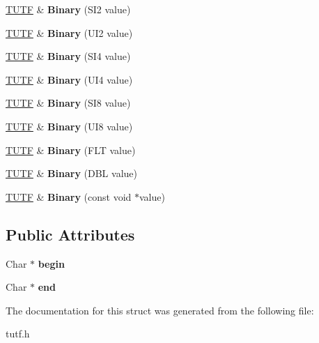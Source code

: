 \begin{DoxyCompactItemize}
\mbox{\hyperlink{struct___1_1_t_u_t_f}{T\+U\+TF}} \& {\bfseries Binary} (S\+I2 value)
\item 
\mbox{\label{struct___1_1_t_u_t_f_a0c7d211355105fa9977331f0c8e8d592}} 
\mbox{\hyperlink{struct___1_1_t_u_t_f}{T\+U\+TF}} \& {\bfseries Binary} (U\+I2 value)
\item 
\mbox{\label{struct___1_1_t_u_t_f_a6c8d9d534aa7e775af896a83462954c1}} 
\mbox{\hyperlink{struct___1_1_t_u_t_f}{T\+U\+TF}} \& {\bfseries Binary} (S\+I4 value)
\item 
\mbox{\label{struct___1_1_t_u_t_f_abf686fe4bb21e8edb06a7521ec082f72}} 
\mbox{\hyperlink{struct___1_1_t_u_t_f}{T\+U\+TF}} \& {\bfseries Binary} (U\+I4 value)
\item 
\mbox{\label{struct___1_1_t_u_t_f_ad7c1b1c4898e07fd50b14460eb7d38b5}} 
\mbox{\hyperlink{struct___1_1_t_u_t_f}{T\+U\+TF}} \& {\bfseries Binary} (S\+I8 value)
\item 
\mbox{\label{struct___1_1_t_u_t_f_a8488be27f536e84b2842e2f0afae7b49}} 
\mbox{\hyperlink{struct___1_1_t_u_t_f}{T\+U\+TF}} \& {\bfseries Binary} (U\+I8 value)
\item 
\mbox{\label{struct___1_1_t_u_t_f_a8edfbe73971ce6db7c2f6aafd3c5941f}} 
\mbox{\hyperlink{struct___1_1_t_u_t_f}{T\+U\+TF}} \& {\bfseries Binary} (F\+LT value)
\item 
\mbox{\label{struct___1_1_t_u_t_f_a049f47814d4721d454de5732c8469451}} 
\mbox{\hyperlink{struct___1_1_t_u_t_f}{T\+U\+TF}} \& {\bfseries Binary} (D\+BL value)
\item 
\mbox{\label{struct___1_1_t_u_t_f_a1d24b1ef65ca5411f7cff2664ff123af}} 
\mbox{\hyperlink{struct___1_1_t_u_t_f}{T\+U\+TF}} \& {\bfseries Binary} (const void $\ast$value)
\end{DoxyCompactItemize}
\subsection*{Public Attributes}
\begin{DoxyCompactItemize}
\item 
\mbox{\label{struct___1_1_t_u_t_f_a75e6d2718260a484653e7f904ed08948}} 
Char $\ast$ {\bfseries begin}
\item 
\mbox{\label{struct___1_1_t_u_t_f_a585e320e42fb4e57d7170bcd7bc4852f}} 
Char $\ast$ {\bfseries end}
\end{DoxyCompactItemize}


The documentation for this struct was generated from the following file\+:\begin{DoxyCompactItemize}
\item 
tutf.\+h\end{DoxyCompactItemize}
